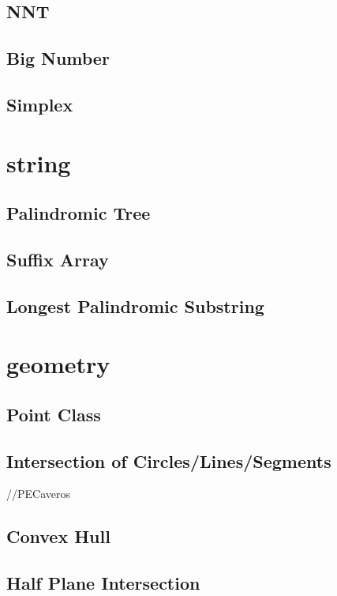 \documentclass[10pt,twocolumn,oneside]{article}
\begin{document}
\subsection{NNT}


\subsection{Big Number}

\subsection{Simplex}


\section{string}
\subsection{Palindromic Tree}

\subsection{Suffix Array}

\subsection{Longest Palindromic Substring}


\section{geometry}
\subsection{Point Class}

\subsection{Intersection of Circles/Lines/Segments}
//PECaveros




\subsection{Convex Hull}

\subsection{Half Plane Intersection}

\end{document}
